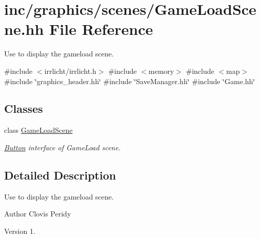 \hypertarget{GameLoadScene_8hh}{}\section{inc/graphics/scenes/\+Game\+Load\+Scene.hh File Reference}
\label{GameLoadScene_8hh}


Use to display the gameload scene.  


{\ttfamily \#include $<$irrlicht/irrlicht.\+h$>$}\newline
{\ttfamily \#include $<$memory$>$}\newline
{\ttfamily \#include $<$map$>$}\newline
{\ttfamily \#include \char`\"{}graphics\+\_\+header.\+hh\char`\"{}}\newline
{\ttfamily \#include \char`\"{}Save\+Manager.\+hh\char`\"{}}\newline
{\ttfamily \#include \char`\"{}Game.\+hh\char`\"{}}\newline
\subsection*{Classes}
\begin{DoxyCompactItemize}
\item 
class \hyperlink{classGameLoadScene}{Game\+Load\+Scene}
\begin{DoxyCompactList}\small\item\em \hyperlink{classButton}{Button} interface of Game\+Load scene. \end{DoxyCompactList}\end{DoxyCompactItemize}


\subsection{Detailed Description}
Use to display the gameload scene. 

\begin{DoxyAuthor}{Author}
Clovis Peridy 
\end{DoxyAuthor}
\begin{DoxyVersion}{Version}
1. 
\end{DoxyVersion}
